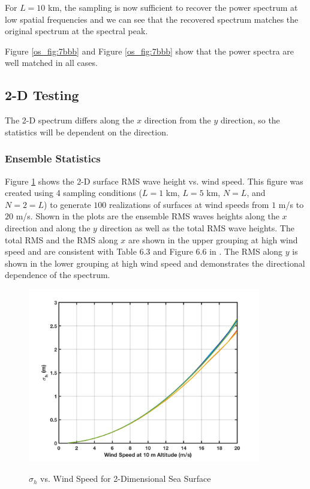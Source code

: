For $L = 10$ km, the sampling is now sufficient to recover the power spectrum at low spatial frequencies and we can see that the recovered spectrum matches the original spectrum at the spectral peak.

Figure \ref{os_fig:7bbb} and Figure \ref{os_fig:7bbb} show that the power spectra are well matched in all cases.

\subsection {2-D Testing}
The 2-D spectrum differs along the $x$ direction from the $y$ direction, so the statistics will be dependent on the direction.

\subsubsection {Ensemble Statistics}
Figure \ref{os_fig:7ffg} shows the 2-D surface RMS wave height vs. wind speed. This figure was created using 4 sampling conditions ($L = 1 $ km, $L = 5 $ km, $N = L$, and $N = 2=L$) to generate $100$ realizations of surfaces at wind speeds from $1$ m/s to $20$ m/s. Shown in the plots are the ensemble RMS waves heights along the $x$ direction and along the $y$ direction as well as the total RMS wave heights. The total RMS and the RMS along $x$ are shown in the upper grouping at high wind speed and are consistent with Table 6.3 and Figure 6.6 in \cite{temper_guide}. The RMS along $y$ is shown in the lower grouping at high wind speed and demonstrates the directional dependence of the spectrum.

\begin{figure}[ht]
  \begin{center}
\includegraphics[width=4in]{../media/Ocean_Surface/2d_ensemble_rms.png}
  \end{center}
  \renewcommand{\baselinestretch}{1} \small\normalsize
  \begin{quote}
    \caption[$\sigma_h$ vs. Wind Speed for 2-Dimensional Sea Surface]{$\sigma_h$ vs. Wind Speed for 2-Dimensional Sea Surface\label{os_fig:7ffg}}
  \end{quote}
\end{figure}
\renewcommand{\baselinestretch}{2} \small\normalsize

